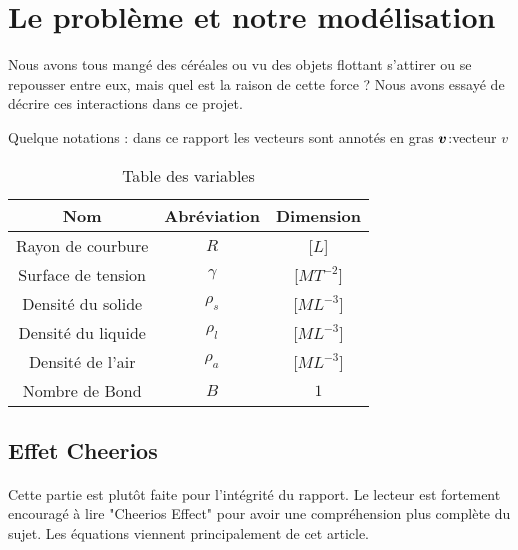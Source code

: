 \section{Le problème et notre modélisation}
    Nous avons tous mangé des céréales ou vu des objets flottant s'attirer ou se repousser entre eux, mais quel est la raison de cette force ? Nous avons essayé de décrire ces interactions dans ce projet.

    Quelque notations : dans ce rapport les vecteurs sont annotés en gras $\vb*{v}$:vecteur $v$
    \begin{table}[H]
        \centering
        \begin{tabular}{ccc}
            \hline
            Nom                & Abréviation & Dimension\\
            \hline
            Rayon de courbure  & $R$         & [$L$]\\
            Surface de tension & $\gamma$    & [$MT^{-2}$]\\ 
            Densité du solide  & $\rho_s$    & [$ML^{-3}$]\\
            Densité du liquide & $\rho_l$    & [$ML^{-3}$]\\
            Densité de l'air   & $\rho_a$    & [$ML^{-3}$]\\
            Nombre de Bond     & $B$         & $1$\\
            \hline
        \end{tabular}
        \caption{Table des variables}
    \end{table}

    \subsection{Effet Cheerios}
        \paragraph*{}{
            Cette partie est plutôt faite pour l'intégrité du rapport. Le lecteur est fortement encouragé à lire "Cheerios Effect"\cite{vella_cheerios_2005} pour avoir une compréhension plus complète du sujet. Les équations viennent principalement de cet article.
        }

